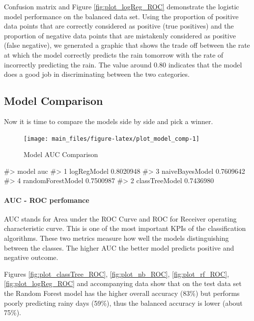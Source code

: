 Confusion matrix and Figure \ref{fig:plot_logReg_ROC} demonstrate the
logistic model performance on the balanced data set. Using the
proportion of positive data points that are correctly considered as
positive (true positives) and the proportion of negative data points
that are mistakenly considered as positive (false negative), we
generated a graphic that shows the trade off between the rate at which
the model correctly predicts the rain tomorrow with the rate of
incorrectly predicting the rain. The value around 0.80 indicates that
the model does a good job in discriminating between the two categories.

\hypertarget{model-comparison}{%
\subsection{Model Comparison}\label{model-comparison}}

Now it is time to compare the models side by side and pick a winner.

\begin{Schunk}
\begin{figure}[H]

{\centering \texttt{[image: main\_files/figure-latex/plot\_model\_comp-1]} 

}

\caption[Model AUC Comparison]{Model AUC Comparison}\label{fig:plot_model_comp}
\end{figure}
\begin{Soutput}
#>               model       auc
#> 1       logRegModel 0.8020948
#> 3   naiveBayesModel 0.7609642
#> 4 randomForestModel 0.7500987
#> 2    classTreeModel 0.7436980
\end{Soutput}
\end{Schunk}

\hypertarget{auc---roc-perfomance}{%
\paragraph{AUC - ROC perfomance}\label{auc---roc-perfomance}}

AUC stands for Area under the ROC Curve and ROC for Receiver operating
characteristic curve. This is one of the most important KPIs of the
classification algorithms. These two metrics measure how well the models
distinguishing between the classes. The higher AUC the better model
predicts positive and negative outcome.

Figures \ref{fig:plot_classTree_ROC}, \ref{fig:plot_nb_ROC},
\ref{fig:plot_rf_ROC}, \ref{fig:plot_logReg_ROC} and accompanying data
show that on the test data set the Random Forest model has the higher
overall accuracy (83\%) but performs poorly predicting rainy days
(59\%), thus the balanced accuracy is lower (about 75\%).

